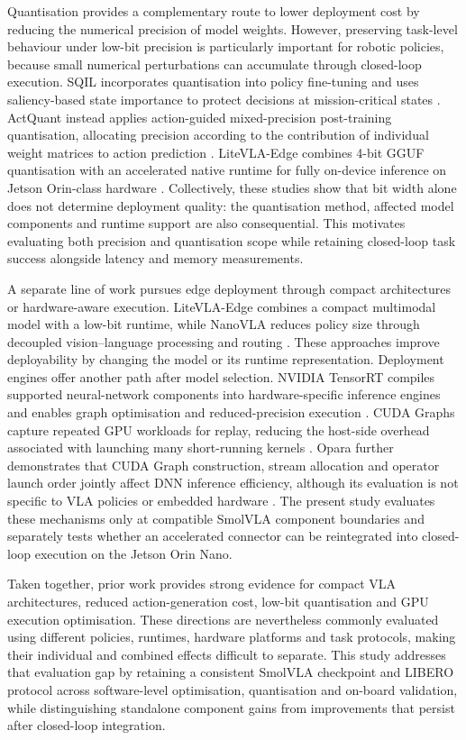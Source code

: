 Quantisation provides a complementary route to lower deployment cost by reducing the numerical precision of model weights. However, preserving task-level behaviour under low-bit precision is particularly important for robotic policies, because small numerical perturbations can accumulate through closed-loop execution. SQIL incorporates quantisation into policy fine-tuning and uses saliency-based state importance to protect decisions at mission-critical states \cite{sqil}. ActQuant instead applies action-guided mixed-precision post-training quantisation, allocating precision according to the contribution of individual weight matrices to action prediction \cite{actquant}. LiteVLA-Edge combines 4-bit GGUF quantisation with an accelerated native runtime for fully on-device inference on Jetson Orin-class hardware \cite{litevlaedge}. Collectively, these studies show that bit width alone does not determine deployment quality: the quantisation method, affected model components and runtime support are also consequential. This motivates evaluating both precision and quantisation scope while retaining closed-loop task success alongside latency and memory measurements.

A separate line of work pursues edge deployment through compact architectures or hardware-aware execution. LiteVLA-Edge combines a compact multimodal model with a low-bit runtime, while NanoVLA reduces policy size through decoupled vision--language processing and routing \cite{litevlaedge,nanovla}. These approaches improve deployability by changing the model or its runtime representation. Deployment engines offer another path after model selection. NVIDIA TensorRT compiles supported neural-network components into hardware-specific inference engines and enables graph optimisation and reduced-precision execution \cite{nvidia_tensorrt}. CUDA Graphs capture repeated GPU workloads for replay, reducing the host-side overhead associated with launching many short-running kernels \cite{nvidia_cuda_graphs}. Opara further demonstrates that CUDA Graph construction, stream allocation and operator launch order jointly affect DNN inference efficiency, although its evaluation is not specific to VLA policies or embedded hardware \cite{opara}. The present study evaluates these mechanisms only at compatible SmolVLA component boundaries and separately tests whether an accelerated connector can be reintegrated into closed-loop execution on the Jetson Orin Nano.

Taken together, prior work provides strong evidence for compact VLA architectures, reduced action-generation cost, low-bit quantisation and GPU execution optimisation. These directions are nevertheless commonly evaluated using different policies, runtimes, hardware platforms and task protocols, making their individual and combined effects difficult to separate. This study addresses that evaluation gap by retaining a consistent SmolVLA checkpoint and LIBERO protocol across software-level optimisation, quantisation and on-board validation, while distinguishing standalone component gains from improvements that persist after closed-loop integration.

